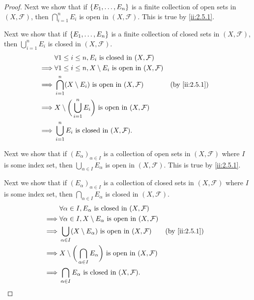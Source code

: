 \begin{proof}
  Next we show that if \(\left\lbrace E_1, \dots, E_n\right\rbrace\) is a finite collection of open sets in \((X, \mathcal{F})\), then \(\bigcap_{i = 1}^n E_i\) is open in \((X, \mathcal{F})\).
  This is true by \cref{ii:2.5.1}.

  Next we show that if \(\left\lbrace E_1, \dots, E_n\right\rbrace\) is a finite collection of closed sets in \((X, \mathcal{F})\), then \(\bigcup_{i = 1}^n E_i\) is closed in \((X, \mathcal{F})\).
  \begin{align*}
             & \forall 1 \leq i \leq n, E_i \text{ is closed in } (X, \mathcal{F})                                   \\
    \implies & \forall 1 \leq i \leq n, X \setminus E_i \text{ is open in } (X, \mathcal{F})                         \\
    \implies & \bigcap_{i = 1}^n (X \setminus E_i) \text{ is open in } (X, \mathcal{F})           &  & \by{ii:2.5.1} \\
    \implies & X \setminus \bigg(\bigcup_{i = 1}^n E_i\bigg) \text{ is open in } (X, \mathcal{F})                    \\
    \implies & \bigcup_{i = 1}^n E_i \text{ is closed in } (X, \mathcal{F}).
  \end{align*}

  Next we show that if \((E_\alpha)_{\alpha \in I}\) is a collection of open sets in \((X, \mathcal{F})\) where \(I\) is some index set, then \(\bigcup_{\alpha \in I} E_\alpha\) is open in \((X, \mathcal{F})\).
  This is true by \cref{ii:2.5.1}.

  Next we show that if \((E_\alpha)_{\alpha \in I}\) is a collection of closed sets in \((X, \mathcal{F})\) where \(I\) is some index set, then \(\bigcap_{\alpha \in I} E_\alpha\) is closed in \((X, \mathcal{F})\).
  \begin{align*}
             & \forall \alpha \in I, E_\alpha \text{ is closed in } (X, \mathcal{F})                                           \\
    \implies & \forall \alpha \in I, X \setminus E_\alpha \text{ is open in } (X, \mathcal{F})                                 \\
    \implies & \bigcup_{\alpha \in I} (X \setminus E_\alpha) \text{ is open in } (X, \mathcal{F})           &  & \by{ii:2.5.1} \\
    \implies & X \setminus \bigg(\bigcap_{\alpha \in I} E_\alpha\bigg) \text{ is open in } (X, \mathcal{F})                    \\
    \implies & \bigcap_{\alpha \in I} E_\alpha \text{ is closed in } (X, \mathcal{F}).
  \end{align*}


\end{proof}
